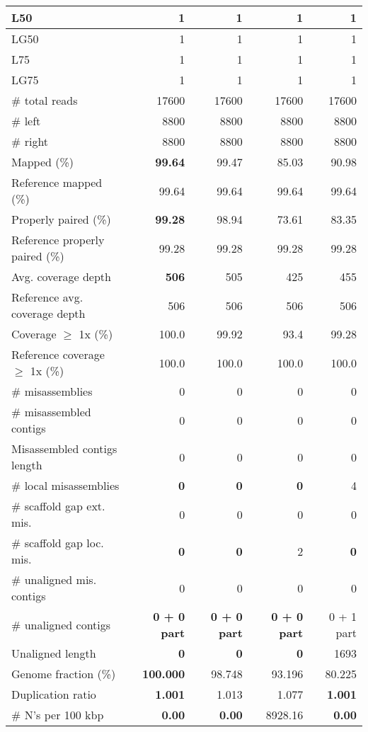 \documentclass[12pt,a4paper]{article}
\begin{document}
\begin{table}[ht]
\begin{center}
\begin{tabular}{|l*{4}{|r}|}
L50 & 1 & 1 & 1 & 1 \\ \hline
LG50 & 1 & 1 & 1 & 1 \\ \hline
L75 & 1 & 1 & 1 & 1 \\ \hline
LG75 & 1 & 1 & 1 & 1 \\ \hline
\# total reads & 17600 & 17600 & 17600 & 17600 \\ \hline
\# left & 8800 & 8800 & 8800 & 8800 \\ \hline
\# right & 8800 & 8800 & 8800 & 8800 \\ \hline
Mapped (\%) & {\bf 99.64} & 99.47 & 85.03 & 90.98 \\ \hline
Reference mapped (\%) & 99.64 & 99.64 & 99.64 & 99.64 \\ \hline
Properly paired (\%) & {\bf 99.28} & 98.94 & 73.61 & 83.35 \\ \hline
Reference properly paired (\%) & 99.28 & 99.28 & 99.28 & 99.28 \\ \hline
Avg. coverage depth & {\bf 506} & 505 & 425 & 455 \\ \hline
Reference avg. coverage depth & 506 & 506 & 506 & 506 \\ \hline
Coverage $\geq$ 1x (\%) & 100.0 & 99.92 & 93.4 & 99.28 \\ \hline
Reference coverage $\geq$ 1x (\%) & 100.0 & 100.0 & 100.0 & 100.0 \\ \hline
\# misassemblies & 0 & 0 & 0 & 0 \\ \hline
\# misassembled contigs & 0 & 0 & 0 & 0 \\ \hline
Misassembled contigs length & 0 & 0 & 0 & 0 \\ \hline
\# local misassemblies & {\bf 0} & {\bf 0} & {\bf 0} & 4 \\ \hline
\# scaffold gap ext. mis. & 0 & 0 & 0 & 0 \\ \hline
\# scaffold gap loc. mis. & {\bf 0} & {\bf 0} & 2 & {\bf 0} \\ \hline
\# unaligned mis. contigs & 0 & 0 & 0 & 0 \\ \hline
\# unaligned contigs & {\bf 0 + 0 part} & {\bf 0 + 0 part} & {\bf 0 + 0 part} & 0 + 1 part \\ \hline
Unaligned length & {\bf 0} & {\bf 0} & {\bf 0} & 1693 \\ \hline
Genome fraction (\%) & {\bf 100.000} & 98.748 & 93.196 & 80.225 \\ \hline
Duplication ratio & {\bf 1.001} & 1.013 & 1.077 & {\bf 1.001} \\ \hline
\# N's per 100 kbp & {\bf 0.00} & {\bf 0.00} & 8928.16 & {\bf 0.00} \\ \hline

\end{tabular}
\end{center}
\end{table}
\end{document}
